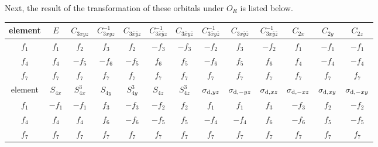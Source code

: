 \documentclass[a4paper]{book}
\begin{document}
\begin{solution}
\begin{itemize}
		\end{itemize}				
		
		Next, the result of the transformation of these orbitals under $O_R$ is listed below. \vspace{-0.5em}
		\begin{center}
		\begin{tabular}{ccccccccccccc} \hline
			element & $E$ & $C_{3xyz}$ & $C^{-1}_{3xyz}$ & $C_{3\bar x \bar y z}$ & $C^{-1}_{3\bar x \bar yz}$ & $C_{3\bar x y \bar z}$ & $C^{-1}_{3\bar x y \bar z}$ &  $C_{3 x\bar y \bar z}$ & $C^{-1}_{3x\bar y \bar z}$ & $C_{2x}$ & $C_{2y}$ & $C_{2z}$ \\ \hline
			$f_1$	&	$f_1$	&	$f_2$	&	$f_3$	&	$f_2$	&	$-f_3$	&	$-f_3$	&	$-f_2$	&	$f_3$	&	$-f_2$	&	$f_1$	&	$-f_1$	&	$-f_1$	\\
			$f_4$	&	$f_4$	&	$-f_5$	&	$-f_6$	&	$-f_5$	&	$f_6$	&	$f_5$	&	$-f_6$	&	$f_5$	&	$f_6$	&	$f_4$	&	$-f_4$	&	$-f_4$	\\
			$f_7$	&	$f_7$	&	$f_7$	&	$f_7$	&	$f_7$	&	$f_7$	&	$f_7$	&	$f_7$	&	$f_7$	&	$f_7$	&	$f_7$	&	$f_7$	&	$f_7$	\\ \hline
			element & $S_{4x}$ & $S^3_{4x}$ & $S_{4y}$ & $S^3_{4y}$ & $S_{4z}$ & $S^{3}_{4z}$ & $\sigma_{{\rm d},yz}$ &  $\sigma_{{\rm d},-yz}$ & $\sigma_{{\rm d},xz}$ & $\sigma_{{\rm d},-xz}$ & $\sigma_{{\rm d},xy}$ & $\sigma_{{\rm d},-xy}$ \\ \hline
			$f_1$	&	$-f_1$	&	$-f_1$	&	$f_3$	&	$-f_3$	&	$-f_2$	&	$f_2$	&	$f_1$	&	$f_1$	&	$f_3$	&	$-f_3$	&	$f_2$	&	$-f_2$	\\
			$f_4$	&	$f_4$	&	$f_4$	&	$f_6$	&	$-f_6$	&	$-f_5$	&	$f_5$	&	$-f_4$	&	$-f_4$	&	$f_6$	&	$-f_6$	&	$f_5$	&	$-f_5$	\\
			$f_7$	&	$f_7$	&	$f_7$	&	$f_7$	&	$f_7$	&	$f_7$	&	$f_7$	&	$f_7$	&	$f_7$	&	$f_7$	&	$f_7$	&	$f_7$	&	$f_7$	\\ \hline
		\end{tabular}
		\end{center}
		

\end{solution}
\end{document}

